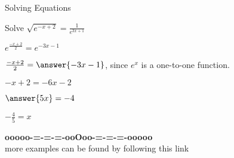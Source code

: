 \documentclass{ximera}
\begin{document}
\begin{example} Solving Equations


Solve $\sqrt{e^{-x + 2}} = \frac{1}{e^{3x+1}}$


\begin{explanation}

$e^{\tfrac{-x + 2}{2}}= e^{-3x-1}$


$\frac{-x + 2}{2} = \answer{-3x-1}$, since $e^x$ is a one-to-one function.

$-x + 2 = -6x - 2$

$\answer{5x} = -4$


$-\frac{4}{5} = x$
\end{explanation}
\end{example}











\begin{center}
\textbf{\textcolor{green!50!black}{ooooo-=-=-=-ooOoo-=-=-=-ooooo}} \\

more examples can be found by following this link\\ 

\end{center}
\end{document}
